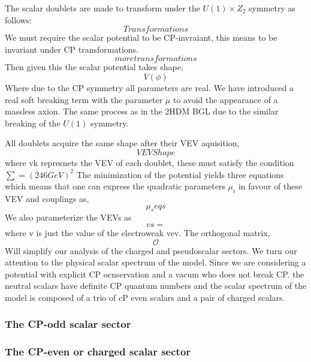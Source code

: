 The scalar doublets are made to transform under the $U(1) \times Z_2$ symmetry as follows: 
\begin{equation}
Transformations 
\end{equation}
We must require the scalar potential to be CP-invraiant, this means to be invariant under CP transformations. 
\begin{equation}
more transformations
\end{equation}
Then given this the scalar potential takes shape,
\begin{equation}
V(\phi)
\end{equation}
Where due to the CP symmetry all parameters are real. We have introduced a real soft breaking term with the parameter $\mu$ to avoid the appearance of a massless axion. The same process as in the 2HDM BGL due to the similar breaking of the $U(1)$ symmetry. 

All doublets acquire the same shape after their  VEV aquisition, 
\begin{equation}
VEV Shape 
\end{equation}
where vk represnets the VEV of each doublet, these must satisfy the condition $\sum = (246 GeV)^2$ The minimization of the potential yields three equations which means that one can express the quadratic parameters  $\mu_i$ in favour of these VEV and couplings as, 
%
\begin{equation}
\mu_s eqs 
\end{equation}
%
We also parameterize the VEVs as
%
\begin{equation}
vs = 
\end{equation}
%
where v is just the value of the electroweak vev. The orthogonal matrix, 
%
\begin{equation}
\mathcal{O}
\end{equation}
%
Will simplify our analysis of the charged and pseudoscalar sectors. We turn our attention to the physical scalar spectrum of the model. Since we are considering a potential with explicit CP ocnservation and a vacum who does not break CP. the neutral scalars have definite CP quantum numbers and the scalar spectrum of the model is composed of a trio of cP even scalars and a pair of charged scalars. 

\subsubsection{The CP-odd scalar sector}

\subsubsection{The CP-even or charged scalar sector}

